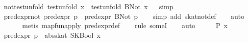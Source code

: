 \begin{isabellebody}
\isanewline
{}\isamarkupfalse%
\ not{}test{}unfold{}\ {}{}{}test{}unfold\ x{}\ {}\ test{}unfold\ {}BNot\ x{}{}%
\isadelimproof
\ %
\endisadelimproof
%
\isatagproof
{}\isamarkupfalse%
\ simp%
\endisatagproof
{\isafoldproof}%
%
\isadelimproof
%
\endisadelimproof
\isanewline
\isanewline
{}\isamarkupfalse%
\ pred{}expr{}not{}\ {}{}{}pred{}expr\ p{}\ {}\ pred{}expr\ {}BNot\ p{}{}\isanewline
%
\isadelimproof
\ \ %
\endisadelimproof
%
\isatagproof
{}\isamarkupfalse%
\ {}simp\ add{}\ skat{}not{}def{}\isanewline
\ \ \isamarkupfalse%
\ auto\isanewline
\ \ \isamarkupfalse%
\isanewline
\ \ \isamarkupfalse%
\ {}metis\ map{}fun{}apply\ pred{}expr{}def{}\isanewline
\ \ \isamarkupfalse%
\ {}rule\ someI{}{}\isanewline
\ \ \isamarkupfalse%
\ auto\isanewline
{}\isamarkupfalse%
\ {}\isanewline
\ \ \isamarkupfalse%
\ P\ x\ \isamarkupfalse%
\ {}pred{}expr\ p\ {}\ abs{}skat\ {}SKBool\ x{}{}\isanewline

\end{isabellebody}

